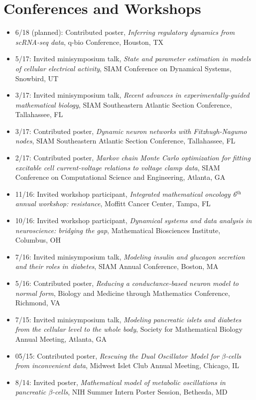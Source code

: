 \documentclass[11pt]{cv}
\begin{document}
\section*{Conferences and Workshops}
\label{sec:org33b2d4d}
\begin{itemize}
\item 6/18 (planned): Contributed poster, \emph{Inferring regulatory dynamics from scRNA-seq data}, q-bio Conference, Houston, TX\\
\item 5/17: Invited minisymposium talk, \emph{State and parameter estimation in models of cellular electrical activity}, SIAM Conference on Dynamical Systems, Snowbird, UT\\
\item 3/17: Invited minisymposium talk, \emph{Recent advances in experimentally-guided mathematical biology}, SIAM Southeastern Atlantic Section Conference, Tallahassee, FL\\
\item 3/17: Contributed poster, \emph{Dynamic neuron networks with Fitzhugh-Nagumo nodes}, SIAM Southeastern Atlantic Section Conference, Tallahassee, FL\\
\item 2/17: Contributed poster, \emph{Markov chain Monte Carlo optimization for fitting excitable cell current-voltage relations to voltage clamp data}, SIAM Conference on Computational Science and Engineering, Atlanta, GA\\
\item 11/16: Invited workshop participant, \emph{Integrated mathematical oncology 6\(^{\text{th}}\) annual workshop: resistance}, Moffitt Cancer Center, Tampa, FL\\
\item 10/16: Invited workshop participant, \emph{Dynamical systems and data analysis in neuroscience: bridging the gap}, Mathematical Biosciences Institute, Columbus, OH\\
\item 7/16: Invited minisymposium talk, \emph{Modeling insulin and glucagon secretion and their roles in diabetes}, SIAM Annual Conference, Boston, MA\\
\item 5/16: Contributed poster, \emph{Reducing a conductance-based neuron model to normal form}, Biology and Medicine through Mathematics Conference, Richmond, VA\\
\item 7/15: Invited minisymposium talk, \emph{Modeling pancreatic islets and diabetes from the cellular level to the whole body}, Society for Mathematical Biology Annual Meeting, Atlanta, GA\\
\item 05/15: Contributed poster, \emph{Rescuing the Dual Oscillator Model for \(\beta\)-cells from inconvenient data}, Midwest Islet Club Annual Meeting, Chicago, IL\\
\item 8/14: Invited poster, \emph{Mathematical model of metabolic oscillations in pancreatic \(\beta\)-cells}, NIH Summer Intern Poster Session, Bethesda, MD\\
\end{itemize}
\end{document}
